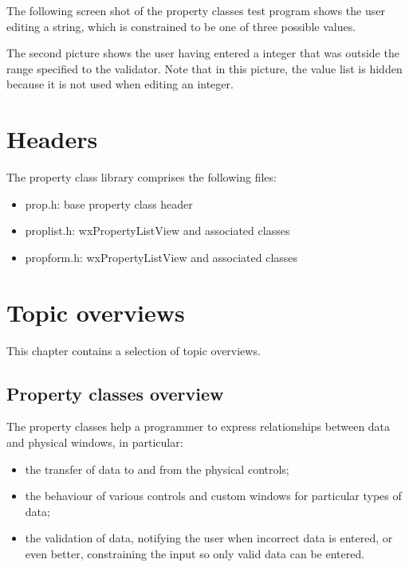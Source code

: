 The following screen shot of the property classes test program shows the
user editing a string, which is constrained to be one of three possible
values.


The second picture shows the user having entered a integer that
was outside the range specified to the validator. Note that in this picture,
the value list is hidden because it is not used when editing an integer.


\section{Headers}\label{proplistfiles}

The property class library comprises the following files:

\begin{itemize}\itemsep=0pt
\item prop.h: base property class header
\item proplist.h: wxPropertyListView and associated classes
\item propform.h: wxPropertyListView and associated classes
\end{itemize}

\section{Topic overviews}\label{proplistoverviews}

This chapter contains a selection of topic overviews.

\subsection{Property classes overview}\label{proplistpropertyoverview}

The property classes help a programmer to express relationships between
data and physical windows, in particular:

\begin{itemize}\itemsep=0pt
\item the transfer of data to and from the physical controls;
\item the behaviour of various controls and custom windows for particular
types of data;
\item the validation of data, notifying the user when incorrect data is entered,
or even better, constraining the input so only valid data can be entered.
\end{itemize}

